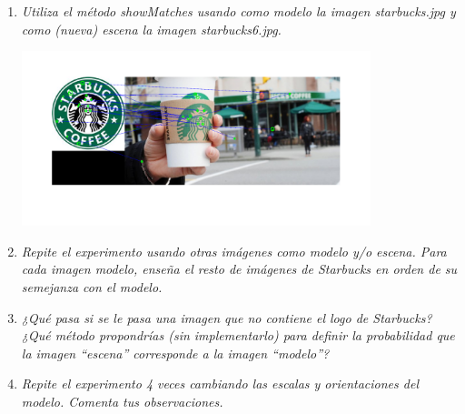 \documentclass{article}
\begin{document}
\begin{enumerate}
 \begin{enumerate}
 \item \textit{Utiliza  el  método  showMatches usando  como  modelo  la  imagen 
 starbucks.jpg y como (nueva) escena la imagen starbucks6.jpg.}

\begin{center}
	\includegraphics[width=0.8\textwidth]{ej35a.png}
\end{center}

 \item \textit{Repite el experimento  usando otras imágenes  como modelo  y/o escena. 
Para cada imagen modelo, enseña el  resto de imágenes de Starbucks en orden de su semejanza con el modelo.}



 \item \textit{¿Qué pasa si se le pasa una imagen que no contiene el logo de Starbucks? 
¿Qué  método  propondrías  (sin  implementarlo)  para  definir la 
probabilidad que la imagen “escena” corresponde a la imagen “modelo”?}

 \item \textit {Repite el experimento 4 veces cambiando las escalas y orientaciones del 
modelo. Comenta tus observaciones.}
 
 \end{enumerate}

\end{enumerate}
\end{document}
